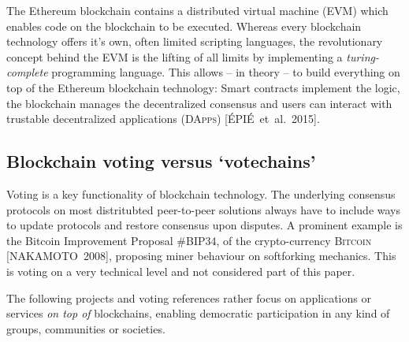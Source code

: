 The Ethereum blockchain contains a distributed virtual machine (\textsc{EVM}) which enables code on the blockchain to be executed. Whereas every blockchain technology offers it's own, often limited scripting languages, the revolutionary concept behind the EVM is the lifting of all limits by implementing a \textit{turing-complete} programming language. This allows -- in theory -- to build everything on top of the Ethereum blockchain technology: Smart contracts implement the logic, the blockchain manages the decentralized consensus and users can interact with trustable decentralized applications (\textsc{DApps}) [ÉPIÉ~et~al.~2015].

\subsection{Blockchain voting versus \enquote*{votechains}}
Voting is a key functionality of blockchain technology. The underlying consensus protocols on most distritubted peer-to-peer solutions always have to include ways to update protocols and restore consensus upon disputes. A prominent example is the Bitcoin Improvement Proposal \#BIP34, of the crypto-currency \textsc{Bitcoin} [NAKAMOTO~2008], proposing miner behaviour on softforking mechanics. This is voting on a very technical level and not considered part of this paper.\par
The following projects and voting references rather focus on applications or services \textit{on top of} blockchains, enabling democratic participation in any kind of groups, communities or societies.

